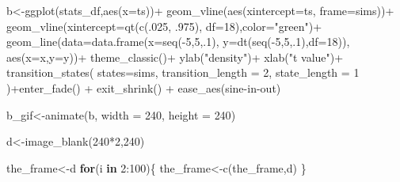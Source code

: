 \documentclass[
  letterpaper,
  DIV=11,
  numbers=noendperiod]{scrreprt}
\newenvironment{Shaded}{\begin{snugshade}}{\end{snugshade}}
\newcommand{\AttributeTok}[1]{\textcolor[rgb]{0.40,0.45,0.13}{#1}}
\newcommand{\ControlFlowTok}[1]{\textcolor[rgb]{0.00,0.23,0.31}{\textbf{#1}}}
\newcommand{\DecValTok}[1]{\textcolor[rgb]{0.68,0.00,0.00}{#1}}
\newcommand{\FunctionTok}[1]{\textcolor[rgb]{0.28,0.35,0.67}{#1}}
\newcommand{\NormalTok}[1]{\textcolor[rgb]{0.00,0.23,0.31}{#1}}
\newcommand{\OtherTok}[1]{\textcolor[rgb]{0.00,0.23,0.31}{#1}}
\newcommand{\SpecialCharTok}[1]{\textcolor[rgb]{0.37,0.37,0.37}{#1}}
\newcommand{\StringTok}[1]{\textcolor[rgb]{0.13,0.47,0.30}{#1}}
\begin{document}
\begin{Shaded}
\begin{Highlighting}[]
\NormalTok{b}\OtherTok{\textless{}{-}}\FunctionTok{ggplot}\NormalTok{(stats\_df,}\FunctionTok{aes}\NormalTok{(}\AttributeTok{x=}\NormalTok{ts))}\SpecialCharTok{+}
  \FunctionTok{geom\_vline}\NormalTok{(}\FunctionTok{aes}\NormalTok{(}\AttributeTok{xintercept=}\NormalTok{ts, }\AttributeTok{frame=}\NormalTok{sims))}\SpecialCharTok{+}
  \FunctionTok{geom\_vline}\NormalTok{(}\AttributeTok{xintercept=}\FunctionTok{qt}\NormalTok{(}\FunctionTok{c}\NormalTok{(.}\DecValTok{025}\NormalTok{, .}\DecValTok{975}\NormalTok{), }\AttributeTok{df=}\DecValTok{18}\NormalTok{),}\AttributeTok{color=}\StringTok{"green"}\NormalTok{)}\SpecialCharTok{+}
  \FunctionTok{geom\_line}\NormalTok{(}\AttributeTok{data=}\FunctionTok{data.frame}\NormalTok{(}\AttributeTok{x=}\FunctionTok{seq}\NormalTok{(}\SpecialCharTok{{-}}\DecValTok{5}\NormalTok{,}\DecValTok{5}\NormalTok{,.}\DecValTok{1}\NormalTok{),}
                            \AttributeTok{y=}\FunctionTok{dt}\NormalTok{(}\FunctionTok{seq}\NormalTok{(}\SpecialCharTok{{-}}\DecValTok{5}\NormalTok{,}\DecValTok{5}\NormalTok{,.}\DecValTok{1}\NormalTok{),}\AttributeTok{df=}\DecValTok{18}\NormalTok{)),}
            \FunctionTok{aes}\NormalTok{(}\AttributeTok{x=}\NormalTok{x,}\AttributeTok{y=}\NormalTok{y))}\SpecialCharTok{+}
  \FunctionTok{theme\_classic}\NormalTok{()}\SpecialCharTok{+}
  \FunctionTok{ylab}\NormalTok{(}\StringTok{"density"}\NormalTok{)}\SpecialCharTok{+}
  \FunctionTok{xlab}\NormalTok{(}\StringTok{"t value"}\NormalTok{)}\SpecialCharTok{+}
  \FunctionTok{transition\_states}\NormalTok{(}
    \AttributeTok{states=}\NormalTok{sims,}
    \AttributeTok{transition\_length =} \DecValTok{2}\NormalTok{,}
    \AttributeTok{state\_length =} \DecValTok{1}
\NormalTok{  )}\SpecialCharTok{+}\FunctionTok{enter\_fade}\NormalTok{() }\SpecialCharTok{+} 
  \FunctionTok{exit\_shrink}\NormalTok{() }\SpecialCharTok{+}
  \FunctionTok{ease\_aes}\NormalTok{(}\StringTok{\textquotesingle{}sine{-}in{-}out\textquotesingle{}}\NormalTok{)}

\NormalTok{b\_gif}\OtherTok{\textless{}{-}}\FunctionTok{animate}\NormalTok{(b, }\AttributeTok{width =} \DecValTok{240}\NormalTok{, }\AttributeTok{height =} \DecValTok{240}\NormalTok{)}


\NormalTok{d}\OtherTok{\textless{}{-}}\FunctionTok{image\_blank}\NormalTok{(}\DecValTok{240}\SpecialCharTok{*}\DecValTok{2}\NormalTok{,}\DecValTok{240}\NormalTok{)}

\NormalTok{the\_frame}\OtherTok{\textless{}{-}}\NormalTok{d}
\ControlFlowTok{for}\NormalTok{(i }\ControlFlowTok{in} \DecValTok{2}\SpecialCharTok{:}\DecValTok{100}\NormalTok{)\{}
\NormalTok{  the\_frame}\OtherTok{\textless{}{-}}\FunctionTok{c}\NormalTok{(the\_frame,d)}
\NormalTok{\}}


\end{Highlighting}
\end{Shaded}
\end{document}
